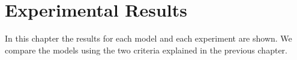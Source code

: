 \chapter{Experimental Results}
\label{ch:expResults}

In this chapter the results for each model and each experiment are shown. We compare the models using the two criteria explained in the previous chapter. 


